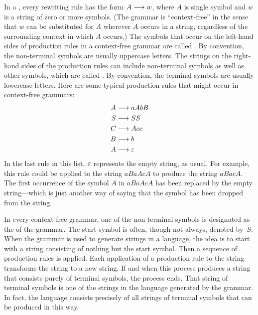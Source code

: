 In a , every rewriting rule has the
form $A\longrightarrow w$, where $A$ is single symbol and $w$ is a string
of zero or more symbols.  (The grammar is ``context-free'' in the
sense that $w$ can be substituted for $A$ wherever $A$ occurs in a string,
regardless of the surrounding context in which $A$ occurs.)
The symbols that occur on the left-hand
sides of production rules in a context-free grammar
are called .
By convention, the non-terminal symbols are usually  uppercase letters.
The strings on the right-hand sides of the production rules can
include non-terminal symbols as well as other symbols, which are
called .  By convention, the
terminal symbols are usually lowercase letters.  Here are some
typical production rules that might occur in context-free grammars:
\begin{align*}
   A&\longrightarrow aAbB\\
   S&\longrightarrow SS\\
   C&\longrightarrow Acc\\
   B&\longrightarrow b\\
   A&\longrightarrow\varepsilon
\end{align*}
In the last rule in this list, $\varepsilon$ represents the empty string,
as usual.  For example, this rule could be applied to the string
$aBaAcA$ to produce the string $aBacA$.  The first occurrence of
the symbol $A$ in $aBaAcA$ has been replaced by the empty string---which
is just another way of saying that the symbol has been dropped from the string.

In every context-free grammar, one of the non-terminal symbols is
designated as the  of the grammar.  The start symbol
is often, though not always, denoted by~$S$.  When the grammar
is used to generate strings in a language, the idea is to start
with a string consisting of nothing but the start symbol.  Then
a sequence of production rules is applied.  Each application of
a production rule to the string transforms the string to a new
string.  If and when this process produces a string that consists
purely of terminal symbols, the process ends.  That string of
terminal symbols is one of the strings in the language generated
by the grammar.  In fact, the language consists precisely of
all strings of terminal symbols that can be produced in this way.

